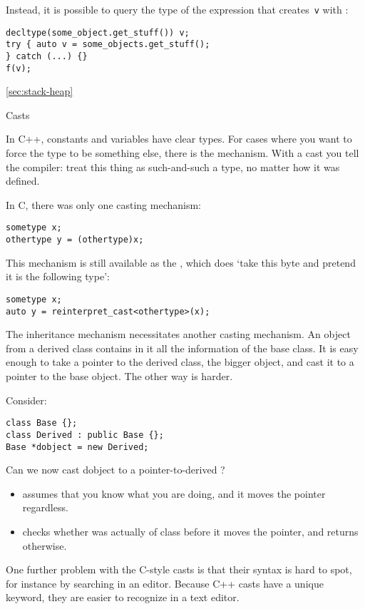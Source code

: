 Instead, it is possible to query the type of the expression that
creates~\lstinline{v} with :
\begin{lstlisting}
decltype(some_object.get_stuff()) v;
try { auto v = some_objects.get_stuff(); 
} catch (...) {}
f(v);
\end{lstlisting}

\ref{sec:stack-heap}

 {Casts}
\label{sec:cast}

In C++, constants and variables have clear types. For cases where you
want to force the type to be something else, there is the
 mechanism. With a cast you tell the compiler:
treat this thing as such-and-such a type, no matter how it was
defined.

In C, there was only one casting mechanism:
\begin{lstlisting}
sometype x;
othertype y = (othertype)x;
\end{lstlisting}
This mechanism is still available as the
, which does `take this byte and pretend
it is the following type':
\begin{lstlisting}
sometype x;
auto y = reinterpret_cast<othertype>(x);
\end{lstlisting}

The inheritance mechanism necessitates another casting mechanism.
An object from a derived class contains in it all the information of
the base class. It is easy enough to take a pointer to the derived
class, the bigger object, and cast it to a pointer to the base object.
The other way is harder.

Consider:
\begin{lstlisting}
class Base {};
class Derived : public Base {};
Base *dobject = new Derived;
\end{lstlisting}
Can we now cast dobject to a pointer-to-derived ?
\begin{itemize}
\item {} assumes that you know what you are
  doing, and it moves the pointer regardless.
\item {} checks whether  was
  actually of class  before it moves the pointer, and
  returns  otherwise.
\end{itemize}

\begin{remark}
  One further problem with the C-style casts is that their syntax is
  hard to spot, for instance by searching in an editor.
  Because C++ casts have a unique keyword, they are easier to recognize
  in a text editor.
\end{remark}

